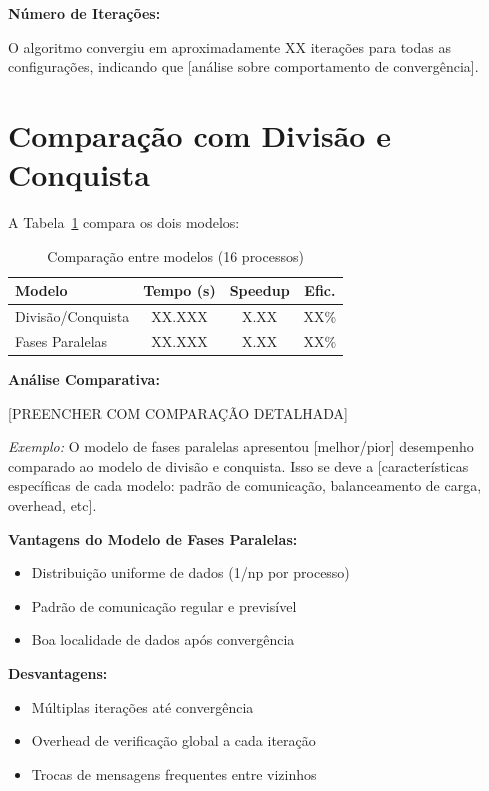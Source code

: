 \documentclass[10pt,twocolumn]{article}
\begin{document}
\textbf{Número de Iterações:}

O algoritmo convergiu em aproximadamente XX iterações para todas as configurações, indicando que [análise sobre comportamento de convergência].

\section{Comparação com Divisão e Conquista}

A Tabela~\ref{tab:comparison} compara os dois modelos:

\begin{table}[h]
\centering
\small
\begin{tabular}{@{}lccc@{}}
\toprule
\textbf{Modelo} & \textbf{Tempo (s)} & \textbf{Speedup} & \textbf{Efic.} \\
\midrule
Divisão/Conquista & XX.XXX & X.XX & XX\% \\
Fases Paralelas   & XX.XXX & X.XX & XX\% \\
\bottomrule
\end{tabular}
\caption{Comparação entre modelos (16 processos)}
\label{tab:comparison}
\end{table}

\textbf{Análise Comparativa:}

[PREENCHER COM COMPARAÇÃO DETALHADA]

\textit{Exemplo:} O modelo de fases paralelas apresentou [melhor/pior] desempenho comparado ao modelo de divisão e conquista. Isso se deve a [características específicas de cada modelo: padrão de comunicação, balanceamento de carga, overhead, etc].

\textbf{Vantagens do Modelo de Fases Paralelas:}
\begin{itemize}
    \item Distribuição uniforme de dados (1/np por processo)
    \item Padrão de comunicação regular e previsível
    \item Boa localidade de dados após convergência
\end{itemize}

\textbf{Desvantagens:}
\begin{itemize}
    \item Múltiplas iterações até convergência
    \item Overhead de verificação global a cada iteração
    \item Trocas de mensagens frequentes entre vizinhos
\end{itemize}
\end{document}
